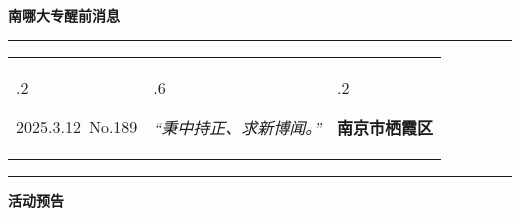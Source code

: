 \documentclass[letterpaper, 12pt]{article}
\begin{document}
\begin{center}
    \Huge\textbf{南哪大专醒前消息}
\end{center}
\vspace{4mm}
\hrule
\renewcommand\tabularxcolumn[1]{m{#1}}
\begin{tabularx}{\textwidth}{>{\hsize.2\hsize}X>{\hsize.6\hsize}X>{\hsize.2\hsize}X}
    \begin{flushleft}
        2025.3.12\, No.189
    \end{flushleft}
    &
    \begin{center}
        \textit{“秉中持正、求新博闻。”}
    \end{center}
    &
    \begin{flushright}
        \textbf{南京市栖霞区}
    \end{flushright}
\end{tabularx}
\vspace{-3.5mm}
\hrule
\vspace{4mm}
\centerline{\huge\textbf{活动预告}}
\end{document}
